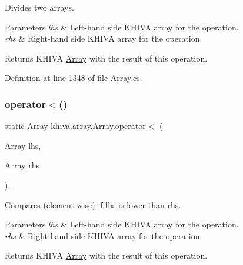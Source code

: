 Divides two arrays. 


\begin{DoxyParams}{Parameters}
{\em lhs} & Left-\/hand side K\+H\+I\+VA array for the operation.\\
\hline
{\em rhs} & Right-\/hand side K\+H\+I\+VA array for the operation.\\
\hline
\end{DoxyParams}
\begin{DoxyReturn}{Returns}
K\+H\+I\+VA \mbox{\hyperlink{classkhiva_1_1array_1_1_array}{Array}} with the result of this operation.
\end{DoxyReturn}


Definition at line 1348 of file Array.\+cs.

\mbox{\label{classkhiva_1_1array_1_1_array_ae1f2d444b7e917810fa703f624ee4b0a}} 
\subsubsection{\texorpdfstring{operator$<$()}{operator<()}}
{\footnotesize\ttfamily static \mbox{\hyperlink{classkhiva_1_1array_1_1_array}{Array}} khiva.\+array.\+Array.\+operator$<$ (\begin{DoxyParamCaption}\item[{\mbox{\hyperlink{classkhiva_1_1array_1_1_array}{Array}}}]{lhs,  }\item[{\mbox{\hyperlink{classkhiva_1_1array_1_1_array}{Array}}}]{rhs }\end{DoxyParamCaption})\hspace{0.3cm}{\ttfamily [inline]}, {\ttfamily [static]}}



Compares (element-\/wise) if lhs is lower than rhs. 


\begin{DoxyParams}{Parameters}
{\em lhs} & Left-\/hand side K\+H\+I\+VA array for the operation.\\
\hline
{\em rhs} & Right-\/hand side K\+H\+I\+VA array for the operation.\\
\hline
\end{DoxyParams}
\begin{DoxyReturn}{Returns}
K\+H\+I\+VA \mbox{\hyperlink{classkhiva_1_1array_1_1_array}{Array}} with the result of this operation.
\end{DoxyReturn}


